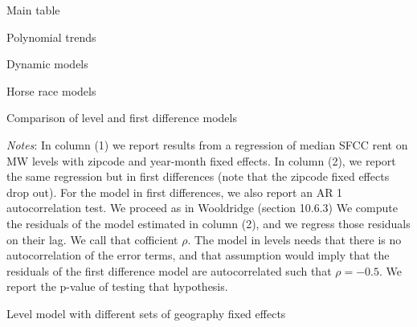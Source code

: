 \documentclass{article}
\begin{document}
\begin{table}[h!] \centering
   \caption{Main table}
   
\end{table}

\begin{table}[h!] \centering
	\caption{Polynomial trends}
	
\end{table}

\clearpage
\begin{table}[h!]\centering
	\caption{Dynamic models}
	
\end{table}

\clearpage
\begin{table}[h!]\centering
	\caption{Horse race models}
	
\end{table}

\clearpage
\begin{table}[h!] \centering
	\caption{Comparison of level and first difference models}
	
	\begin{minipage}{0.9\textwidth} \footnotesize
		\vspace{3mm} 
		\textit{Notes}: In column (1) we report results from a regression of median SFCC rent on MW levels with zipcode and year-month fixed effects. In column (2), we report the same regression but in first differences (note that the zipcode  fixed effects drop out). For the model in first differences, we also report an AR 1 autocorrelation test. We proceed as in Wooldridge (section 10.6.3) We compute the residuals of the model estimated in column (2), and we regress those residuals on their lag. We call that cofficient $\rho$. The model in levels needs that there is no autocorrelation of the error terms, and that assumption would imply that the residuals of the first difference model are autocorrelated such that $\rho = -0.5$. We report the p-value of testing that hypothesis.
	\end{minipage} 
\end{table}

\clearpage
\begin{table}[h!] \centering
	\caption{Level model with different sets of geography fixed effects}
	
\end{table}
\end{document}
